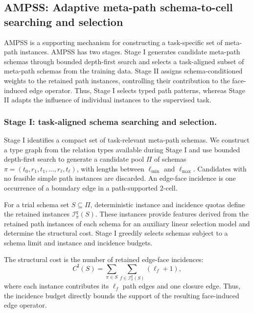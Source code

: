 \documentclass[sigconf,anonymous,review]{acmart}
\newcommand{\ampss}{\textsc{AMPSS}}
\begin{document}
\subsection{\ampss{}: Adaptive meta-path schema-to-cell searching and selection}
\label{sec:ampss}

AMPSS is a supporting mechanism for constructing a task-specific set of meta-path instances. \ampss{} has two stages. Stage I generates candidate meta-path schemas
through bounded depth-first search and selects a task-aligned subset of meta-path schemas from the training data. Stage II assigns schema-conditioned weights to the retained path instances, controlling their contribution to the face-induced edge operator. Thus, Stage I selects typed path patterns, whereas Stage II adapts the influence of individual instances to the
supervised task.

\subsubsection{Stage I: task-aligned schema searching and selection.}
Stage I identifies a compact set of task-relevant meta-path schemas. We
construct a type graph from the relation types available during Stage I and
use bounded depth-first search to generate a candidate pool \(\Pi\) of
schemas \(\pi=(t_0,r_1,t_1,\ldots,r_\ell,t_\ell)\), with lengths between
\(\ell_{\min}\) and \(\ell_{\max}\). Candidates with no feasible simple path
instances are discarded. An edge-face incidence is one occurrence of a boundary edge in a path-supported \(2\)-cell.

For a trial schema set \(S\subseteq\Pi\), deterministic instance and
incidence quotas define the retained instances
\(\mathcal{I}_\pi^q(S)\). These instances provide features derived from the retained path instances of each schema
for an auxiliary linear selection model and determine the structural cost.
Stage I greedily selects schemas subject to a schema limit and instance and
incidence budgets.

The structural cost is the number of retained edge-face incidences:
\begin{equation}
  C^{\mathrm{I}}(S)
  =
  \sum_{\pi\in S}
  \sum_{f\in\mathcal{I}_\pi^q(S)}
  (\ell_f+1),
  \label{eq:stage1-cost}
\end{equation}
where each instance contributes its \(\ell_f\) path edges and one closure edge. Thus, the
incidence budget directly bounds the support of the resulting face-induced edge operator.
\end{document}
